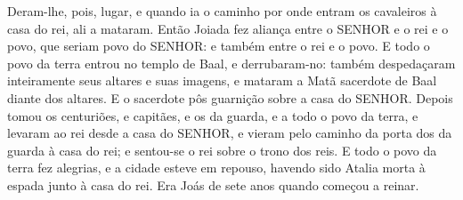 {  Deram-lhe, pois, lugar, e quando ia o caminho por onde entram os cavaleiros à casa do rei, ali a mataram. %
  Então Joiada fez aliança entre o SENHOR e o rei e o povo, que seriam povo do SENHOR: e também entre o rei e o povo.
  E todo o povo da terra entrou no templo de Baal, e derrubaram-no: também despedaçaram inteiramente seus altares e suas imagens, e mataram a Matã sacerdote de Baal diante dos altares. E o sacerdote pôs guarnição sobre a casa do SENHOR.
  Depois tomou os centuriões, e capitães, e os da guarda, e a todo o povo da terra, e levaram ao rei desde a casa do SENHOR, e vieram pelo caminho da porta dos da guarda à casa do rei; e sentou-se o rei sobre o trono dos reis.
  E todo o povo da terra fez alegrias, e a cidade esteve em repouso, havendo sido Atalia morta à espada junto à casa do rei.
  Era Joás de sete anos quando começou a reinar.
\par }

